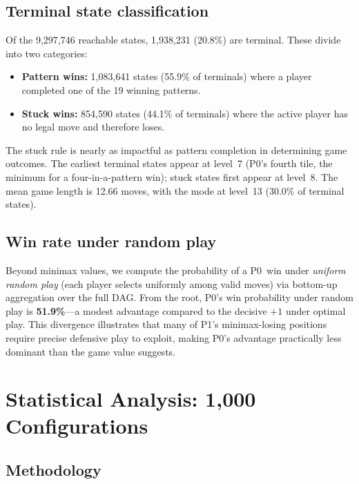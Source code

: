 \documentclass[11pt,a4paper]{article}
\begin{document}
\subsection{Terminal state classification}

Of the 9{,}297{,}746 reachable states, 1{,}938{,}231 (20.8\%) are terminal.
These divide into two categories:
\begin{itemize}
  \item \textbf{Pattern wins:} 1{,}083{,}641 states (55.9\% of terminals)
    where a player completed one of the 19 winning patterns.
  \item \textbf{Stuck wins:} 854{,}590 states (44.1\% of terminals) where
    the active player has no legal move and therefore loses.
\end{itemize}
The stuck rule is nearly as impactful as pattern completion in determining
game outcomes.  The earliest terminal states appear at level~7 (P0's fourth
tile, the minimum for a four-in-a-pattern win); stuck states first appear at
level~8.  The mean game length is 12.66 moves, with the mode at level~13
(30.0\% of terminal states).

\subsection{Win rate under random play}

Beyond minimax values, we compute the probability of a P0~win under
\emph{uniform random play} (each player selects uniformly among valid moves)
via bottom-up aggregation over the full DAG.  From the root, P0's win
probability under random play is \textbf{51.9\%}---a modest advantage
compared to the decisive $+1$ under optimal play.  This divergence
illustrates that many of P1's minimax-losing positions require precise
defensive play to exploit, making P0's advantage practically less dominant
than the game value suggests.

\section{Statistical Analysis: 1{,}000 Configurations}\label{sec:statistical}

\subsection{Methodology}
\end{document}
